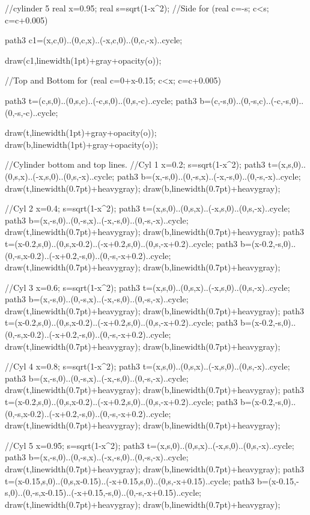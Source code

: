 	//cylinder 5
	real x=0.95;
	real s=sqrt(1-x^2);
	//Side
	for (real c=-s; c<s; c=c+0.005)
	{
		path3 c1=(x,c,0)..(0,c,x)..(-x,c,0)..(0,c,-x)..cycle;
		
		draw(c1,linewidth(1pt)+gray+opacity(o));
	}
	//Top and Bottom
	for (real c=0+x-0.15; c<x; c=c+0.005)
	{
		path3 t=(c,s,0)..(0,s,c)..(-c,s,0)..(0,s,-c)..cycle;
		path3 b=(c,-s,0)..(0,-s,c)..(-c,-s,0)..(0,-s,-c)..cycle;
		
		draw(t,linewidth(1pt)+gray+opacity(o));
		draw(b,linewidth(1pt)+gray+opacity(o));
	}

	//Cylinder bottom and top lines.
		//Cyl 1
		x=0.2;
		s=sqrt(1-x^2);
		path3 t=(x,s,0)..(0,s,x)..(-x,s,0)..(0,s,-x)..cycle;
		path3 b=(x,-s,0)..(0,-s,x)..(-x,-s,0)..(0,-s,-x)..cycle;
		draw(t,linewidth(0.7pt)+heavygray);
		draw(b,linewidth(0.7pt)+heavygray);

		
		//Cyl 2
		x=0.4;
		s=sqrt(1-x^2);
		path3 t=(x,s,0)..(0,s,x)..(-x,s,0)..(0,s,-x)..cycle;
		path3 b=(x,-s,0)..(0,-s,x)..(-x,-s,0)..(0,-s,-x)..cycle;
		draw(t,linewidth(0.7pt)+heavygray);
		draw(b,linewidth(0.7pt)+heavygray);
		path3 t=(x-0.2,s,0)..(0,s,x-0.2)..(-x+0.2,s,0)..(0,s,-x+0.2)..cycle;
		path3 b=(x-0.2,-s,0)..(0,-s,x-0.2)..(-x+0.2,-s,0)..(0,-s,-x+0.2)..cycle;
		draw(t,linewidth(0.7pt)+heavygray);
		draw(b,linewidth(0.7pt)+heavygray);
		
		//Cyl 3
		x=0.6;
		s=sqrt(1-x^2);
		path3 t=(x,s,0)..(0,s,x)..(-x,s,0)..(0,s,-x)..cycle;
		path3 b=(x,-s,0)..(0,-s,x)..(-x,-s,0)..(0,-s,-x)..cycle;
		draw(t,linewidth(0.7pt)+heavygray);
		draw(b,linewidth(0.7pt)+heavygray);
		path3 t=(x-0.2,s,0)..(0,s,x-0.2)..(-x+0.2,s,0)..(0,s,-x+0.2)..cycle;
		path3 b=(x-0.2,-s,0)..(0,-s,x-0.2)..(-x+0.2,-s,0)..(0,-s,-x+0.2)..cycle;
		draw(t,linewidth(0.7pt)+heavygray);
		draw(b,linewidth(0.7pt)+heavygray);

		
		//Cyl 4
		x=0.8;
		s=sqrt(1-x^2);
		path3 t=(x,s,0)..(0,s,x)..(-x,s,0)..(0,s,-x)..cycle;
		path3 b=(x,-s,0)..(0,-s,x)..(-x,-s,0)..(0,-s,-x)..cycle;
		draw(t,linewidth(0.7pt)+heavygray);
		draw(b,linewidth(0.7pt)+heavygray);
		path3 t=(x-0.2,s,0)..(0,s,x-0.2)..(-x+0.2,s,0)..(0,s,-x+0.2)..cycle;
		path3 b=(x-0.2,-s,0)..(0,-s,x-0.2)..(-x+0.2,-s,0)..(0,-s,-x+0.2)..cycle;
		draw(t,linewidth(0.7pt)+heavygray);
		draw(b,linewidth(0.7pt)+heavygray);

		
		//Cyl 5
		x=0.95;
		s=sqrt(1-x^2);
		path3 t=(x,s,0)..(0,s,x)..(-x,s,0)..(0,s,-x)..cycle;
		path3 b=(x,-s,0)..(0,-s,x)..(-x,-s,0)..(0,-s,-x)..cycle;
		draw(t,linewidth(0.7pt)+heavygray);
		draw(b,linewidth(0.7pt)+heavygray);
		path3 t=(x-0.15,s,0)..(0,s,x-0.15)..(-x+0.15,s,0)..(0,s,-x+0.15)..cycle;
		path3 b=(x-0.15,-s,0)..(0,-s,x-0.15)..(-x+0.15,-s,0)..(0,-s,-x+0.15)..cycle;
		draw(t,linewidth(0.7pt)+heavygray);
		draw(b,linewidth(0.7pt)+heavygray);

